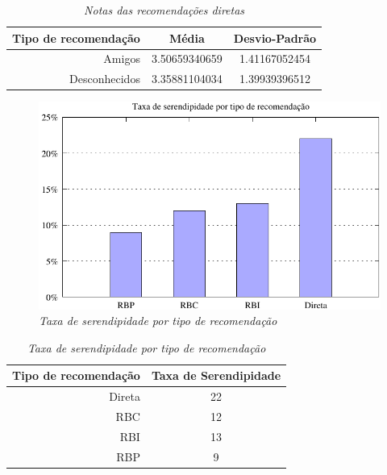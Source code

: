 \begin{table}
\centering
\begin{tabular}{|r|c|c|}
    \hline
    Tipo de recomendação & Média& Desvio-Padrão \\
\hline 
Amigos & 3.50659340659 & 1.41167052454 \\
\hline 
Desconhecidos & 3.35881104034 & 1.39939396512 \\
\hline        
\end{tabular}
\caption{\it Notas das recomendações diretas}
\label{table:notas_medias_diretas}
\end{table}


\begin{figure}
    \centering
    \includegraphics[width=\textwidth]{imagens/grafico_serendipidade}
    \caption{\it Taxa de serendipidade por tipo de recomendação}
    \label{fig:serendipidade}
\end{figure}

\begin{table}
\centering
\begin{tabular}{|r|c|}
    \hline
    Tipo de recomendação & Taxa de Serendipidade \\
\hline 
Direta & 22 \\
\hline 
RBC & 12 \\
\hline 
RBI & 13 \\
\hline 
RBP & 9 \\
\hline        
\end{tabular}
\caption{\it Taxa de serendipidade por tipo de recomendação}
\label{table:serendipidade}
\end{table}


